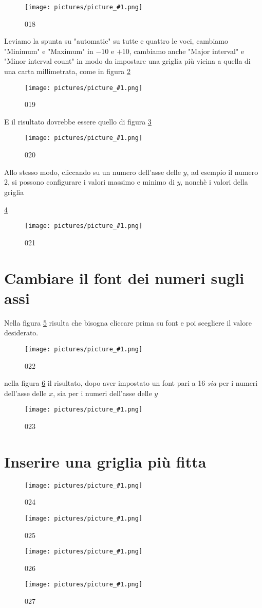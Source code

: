 \documentclass[17pt]{extarticle}
\newcommand{\pict}[1]{
\begin{figure}[h!]		
	\centering
   	\texttt{[image: pictures/picture\_\#1.png]}
  	\caption{#1}
   	\label{fig:LibreOfficeCalc#1}
\end{figure}
}
\begin{document}
%
\pict{018}

Leviamo la spunta su "automatic" su tutte e quattro le voci, cambiamo "Minimum" e "Maximum" in $-10$ e $+10$, cambiamo anche "Major interval" e "Minor interval count" in modo da impostare una griglia più vicina a quella di una carta millimetrata, come in figura \ref{fig:LibreOfficeCalc019}


%
\pict{019}

E il risultato dovrebbe essere quello di figura \ref{fig:LibreOfficeCalc020}

%
\pict{020}

Allo stesso modo, cliccando su un numero dell'asse delle $y$, ad esempio il numero $2$, si possono configurare i valori massimo e minimo di $y$, nonchè i valori della griglia

\ref{fig:LibreOfficeCalc021}


%
\pict{021}


\newpage
\section{Cambiare il font dei numeri sugli assi}

Nella figura \ref{fig:LibreOfficeCalc022} risulta che bisogna cliccare prima su font e poi scegliere il valore desiderato.
%
\pict{022}


nella figura \ref{fig:LibreOfficeCalc023} il risultato, dopo aver impostato un font pari a 16 \emph{sia} per i numeri dell'asse delle $x$, sia per i numeri dell'asse delle $y$

%
\pict{023}

\section{Inserire una griglia più fitta}

%
\pict{024}


%
\pict{025}


%
\pict{026}


%
\pict{027}
\end{document}
